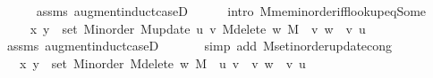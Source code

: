 \begin{isabellebody}
\ \ \ \ \isamarkupfalse%
\ assms\ augment{\isacharunderscore}{\kern0pt}induct{\isacharunderscore}{\kern0pt}case{\isacharunderscore}{\kern0pt}{}D{\isacharparenleft}{\kern0pt}{}{}{\isacharparenright}{\kern0pt}\isanewline
\ \ \ \ \isamarkupfalse%
\ {\isacharparenleft}{\kern0pt}intro\ M{\isachardot}{\kern0pt}mem{\isacharunderscore}{\kern0pt}inorder{\isacharunderscore}{\kern0pt}iff{\isacharunderscore}{\kern0pt}lookup{\isacharunderscore}{\kern0pt}eq{\isacharunderscore}{\kern0pt}Some{\isacharparenright}{\kern0pt}\isanewline
\ \ \isamarkupfalse%
\ \isamarkupfalse%
\ {\isachardoublequoteopen}{\isachardot}{\kern0pt}{\isachardot}{\kern0pt}{\isachardot}{\kern0pt}\ {\isasymlongleftrightarrow}\ {\isacharparenleft}{\kern0pt}x{\isacharcomma}{\kern0pt}\ y{\isacharparenright}{\kern0pt}\ {\isasymin}\ set\ {\isacharparenleft}{\kern0pt}M{\isacharunderscore}{\kern0pt}inorder\ {\isacharparenleft}{\kern0pt}M{\isacharunderscore}{\kern0pt}update\ u\ v\ {\isacharparenleft}{\kern0pt}M{\isacharunderscore}{\kern0pt}delete\ w\ M{\isacharparenright}{\kern0pt}{\isacharparenright}{\kern0pt}{\isacharparenright}{\kern0pt}\ {\isacharminus}{\kern0pt}\ {\isacharbraceleft}{\kern0pt}{\isacharparenleft}{\kern0pt}v{\isacharcomma}{\kern0pt}\ w{\isacharparenright}{\kern0pt}{\isacharbraceright}{\kern0pt}\ {\isasymunion}\ {\isacharbraceleft}{\kern0pt}{\isacharparenleft}{\kern0pt}v{\isacharcomma}{\kern0pt}\ u{\isacharparenright}{\kern0pt}{\isacharbraceright}{\kern0pt}{\isachardoublequoteclose}\isanewline
\ \ \ \ \isamarkupfalse%
\ assms\ augment{\isacharunderscore}{\kern0pt}induct{\isacharunderscore}{\kern0pt}case{\isacharunderscore}{\kern0pt}{}D{\isacharparenleft}{\kern0pt}{}{}{\isacharcomma}{\kern0pt}\ {}{}{\isacharparenright}{\kern0pt}\isanewline
\ \ \ \ \isamarkupfalse%
\ {\isacharparenleft}{\kern0pt}simp\ add{\isacharcolon}{\kern0pt}\ M{\isachardot}{\kern0pt}set{\isacharunderscore}{\kern0pt}inorder{\isacharunderscore}{\kern0pt}update{\isacharunderscore}{\kern0pt}cong{\isacharparenright}{\kern0pt}\isanewline
\ \ \isamarkupfalse%
\ \isamarkupfalse%
\ {\isachardoublequoteopen}{\isachardot}{\kern0pt}{\isachardot}{\kern0pt}{\isachardot}{\kern0pt}\ {\isasymlongleftrightarrow}\ {\isacharparenleft}{\kern0pt}x{\isacharcomma}{\kern0pt}\ y{\isacharparenright}{\kern0pt}\ {\isasymin}\ set\ {\isacharparenleft}{\kern0pt}M{\isacharunderscore}{\kern0pt}inorder\ {\isacharparenleft}{\kern0pt}M{\isacharunderscore}{\kern0pt}delete\ w\ M{\isacharparenright}{\kern0pt}{\isacharparenright}{\kern0pt}\ {\isasymunion}\ {\isacharbraceleft}{\kern0pt}{\isacharparenleft}{\kern0pt}u{\isacharcomma}{\kern0pt}\ v{\isacharparenright}{\kern0pt}{\isacharbraceright}{\kern0pt}\ {\isacharminus}{\kern0pt}\ {\isacharbraceleft}{\kern0pt}{\isacharparenleft}{\kern0pt}v{\isacharcomma}{\kern0pt}\ w{\isacharparenright}{\kern0pt}{\isacharbraceright}{\kern0pt}\ {\isasymunion}\ {\isacharbraceleft}{\kern0pt}{\isacharparenleft}{\kern0pt}v{\isacharcomma}{\kern0pt}\ u{\isacharparenright}{\kern0pt}{\isacharbraceright}{\kern0pt}{\isachardoublequoteclose}\isanewline

\end{isabellebody}
